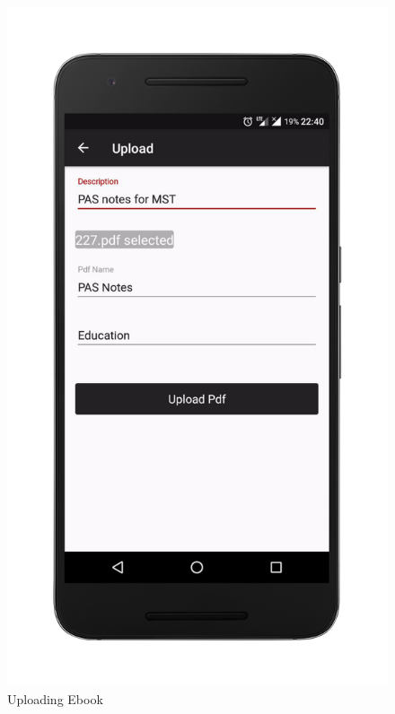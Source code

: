 \begin{figure}[ht]
\centering
\includegraphics[scale=0.13]{images/up.png}
\caption{Uploading Ebook}
\end{figure}

\newpage

